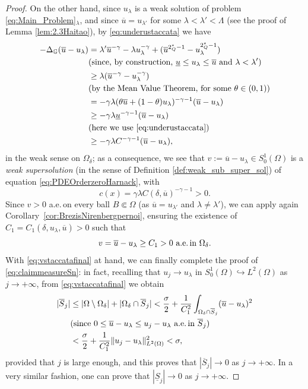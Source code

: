 \documentclass[11pt]{amsart}
\numberwithin{equation}{section} %
\theoremstyle{definition}
\begin{document}
\begin{proof}
	On the other hand, since $u_\lambda$ is a weak solution of problem \eqref{eq:Main_Problem}$_\lambda$,
	and since
	$\overline{u} = u_{\lambda'}$ for some $\lambda<\lambda'<\Lambda$
	(see the proof of Lemma \ref{lem:2.3Haitao}),
	by \eqref{eq:underustaccata} we have 
	\begin{align*}
		-\Delta_{\mathbb{G}} (\overline{u}-u_\lambda) & = \lambda'\overline{u}^{-\gamma}-\lambda u_\lambda^{-\gamma}
		+(\overline{u}^{2^{\star}_{Q}-1}-u_\lambda^{2^{\star}_{Q}-1}) \\
		& (\text{since, by construction, $\underline{u}\leq u_\lambda\leq \overline{u}$
			and $\lambda < \lambda'$}) \\
		& \geq \lambda(\overline{u}^{-\gamma}-u_\lambda^{-\gamma}) \\
		& (\text{by the Mean Value Theorem, for some $\theta\in(0,1)$}) \\
		& = -\gamma\lambda(\theta\overline{u}+(1-\theta)u_\lambda)^{-\gamma-1}(\overline{u}-u_\lambda) \\
		& \geq -\gamma\lambda \underline{u}^{-\gamma-1}(\overline{u}-u_\lambda) \\
		& (\text{here we use \eqref{eq:underustaccata}}) \\
		& \geq -\gamma\lambda C^{-\gamma-1}(\overline{u}-u_\lambda),
	\end{align*}
	in the weak sense on $\Omega_\delta$; as a consequence, we see that $v := \overline{u}-u_\lambda
	\in S^{1}_{0}(\Omega)$ is a \emph{weak supersolution} (in the sense of
	Definition \ref{def:weak_sub_super_sol}) of equation \eqref{eq:PDEOrderzeroHarnack}, with
	$$c(x) = \gamma\lambda C(\delta,\overline{u})^{-\gamma-1} > 0.$$
	Since $v > 0$ a.e.\,on every ball $B\Subset\Omega$ (as $\overline{u} = u_{\lambda'}$ and 
	$\lambda\neq\lambda'$), we can apply again Co\-rol\-la\-ry~\ref{cor:BrezisNirenbergpernoi},
	ensuring the existence of $C_1 = C_1(\delta,u_\lambda,\overline{u}) > 0$ such that
	\begin{equation} \label{eq:vstaccatafinal}
		\text{$v = \overline{u}-u_\lambda \geq C_1 > 0$ a.e.\,in $\Omega_\delta$}.
	\end{equation}
	With \eqref{eq:vstaccatafinal} at hand, we can finally complete the proof
	of \eqref{eq:claimmeasureSn}: in fact, recalling that
	$u_j\to u_\lambda$ in $S^{1}_{0}(\Omega)\hookrightarrow L^2(\Omega)$
	as $j\to+\infty$, from \eqref{eq:vstaccatafinal} we obtain
	\begin{align*}
		|\overline{S}_j| & \leq |\Omega\setminus\Omega_\delta|+|\Omega_\delta\cap\overline{S}_j|
		< \frac{\sigma}{2}+\frac{1}{C_1^2}\int_{\Omega_\delta\cap\overline{S}_j}(\overline{u}-u_\lambda)^2 \\
		& (\text{since $0\leq \overline{u}-u_\lambda\leq u_j-u_\lambda$ a.e.\,in $\overline{S}_j$}) \\
		& < \frac{\sigma}{2}+\frac{1}{C_1^2}\|u_j-u_\lambda\|^2_{L^2(\Omega)} < \sigma,
	\end{align*}
	provided that $j$ is large enough, and this proves that $|\overline{S}_j|\to 0$ as $j\to+\infty$.
	In a very similar fashion, one can prove that $|\underline{S}_j|\to 0$ as $j\to+\infty$.
	\vspace*{0.1cm}
	

\end{proof}
\end{document}
